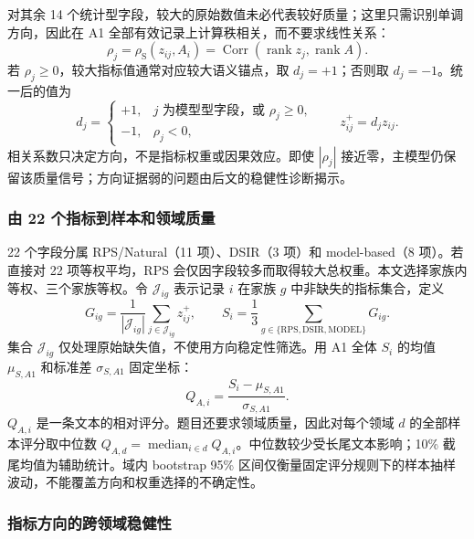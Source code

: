 对其余 14 个统计型字段，较大的原始数值未必代表较好质量；这里只需识别单调方向，因此在 A1 全部有效记录上计算秩相关，而不要求线性关系：
\begin{equation}
\rho_j=\rho_{\mathrm S}(z_{ij},A_i)
=\operatorname{Corr}(\operatorname{rank}z_j,\operatorname{rank}A).
\label{eq:q1_orientation_rho}
\end{equation}
若 $\rho_j\ge0$，较大指标值通常对应较大语义锚点，取 $d_j=+1$；否则取 $d_j=-1$。统一后的值为
\begin{equation}
d_j=\begin{cases}+1,&j\text{ 为模型型字段，或 }\rho_j\ge0,\\-1,&\rho_j<0,\end{cases}
\qquad z^+_{ij}=d_jz_{ij}.
\label{eq:q1_orientation_freeze}
\end{equation}
相关系数只决定方向，不是指标权重或因果效应。即使 $|\rho_j|$ 接近零，主模型仍保留该质量信号；方向证据弱的问题由后文的稳健性诊断揭示。

\subsubsection{由 22 个指标到样本和领域质量}

22 个字段分属 RPS/Natural（11 项）、DSIR（3 项）和 model-based（8 项）。若直接对 22 项等权平均，RPS 会仅因字段较多而取得较大总权重。本文选择家族内等权、三个家族等权。令 $\mathcal J_{ig}$ 表示记录 $i$ 在家族 $g$ 中非缺失的指标集合，定义
\begin{equation}
G_{ig}=\frac{1}{|\mathcal J_{ig}|}\sum_{j\in\mathcal J_{ig}}z^+_{ij},
\qquad S_i=\frac13\sum_{g\in\{\mathrm{RPS,DSIR,MODEL}\}}G_{ig}.
\label{eq:q1_family_score}
\end{equation}
集合 $\mathcal J_{ig}$ 仅处理原始缺失值，不使用方向稳定性筛选。用 A1 全体 $S_i$ 的均值 $\mu_{S,A1}$ 和标准差 $\sigma_{S,A1}$ 固定坐标：
\begin{equation}
Q_{A,i}=\frac{S_i-\mu_{S,A1}}{\sigma_{S,A1}}.
\label{eq:q1_QA}
\end{equation}
$Q_{A,i}$ 是一条文本的相对评分。题目还要求领域质量，因此对每个领域 $d$ 的全部样本评分取中位数 $Q_{A,d}=\operatorname{median}_{i\in d}Q_{A,i}$。中位数较少受长尾文本影响；10\% 截尾均值为辅助统计。域内 bootstrap 95\% 区间仅衡量固定评分规则下的样本抽样波动，不能覆盖方向和权重选择的不确定性。

\subsubsection{指标方向的跨领域稳健性}

